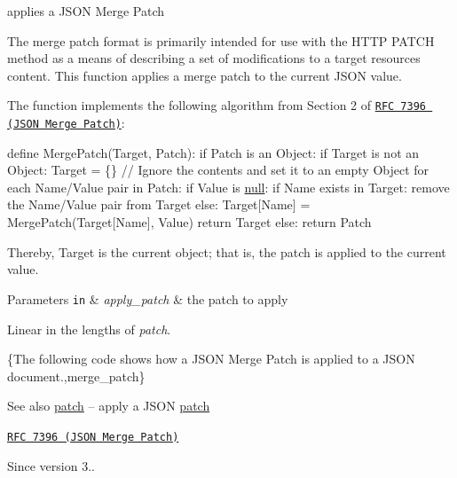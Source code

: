 applies a J\+S\+ON Merge Patch 

The merge patch format is primarily intended for use with the H\+T\+TP P\+A\+T\+CH method as a means of describing a set of modifications to a target resource\textquotesingle{}s content. This function applies a merge patch to the current J\+S\+ON value.

The function implements the following algorithm from Section 2 of \href{https://tools.ietf.org/html/rfc7396}{\tt R\+FC 7396 (J\+S\+ON Merge Patch)}\+:


\begin{DoxyCode}
define MergePatch(Target, Patch):
  if Patch is an Object:
    if Target is not an Object:
      Target = \{\} \textcolor{comment}{// Ignore the contents and set it to an empty Object}
    \textcolor{keywordflow}{for each} Name/Value pair in Patch:
      \textcolor{keywordflow}{if} Value is \hyperlink{namespacenlohmann_1_1detail_a1ed8fc6239da25abcaf681d30ace4985a37a6259cc0c1dae299a7866489dff0bd}{null}:
        \textcolor{keywordflow}{if} Name exists in Target:
          \textcolor{keyword}{remove} the Name/Value pair from Target
      \textcolor{keywordflow}{else}:
        Target[Name] = MergePatch(Target[Name], Value)
    return Target
  else:
    return Patch
\end{DoxyCode}


Thereby, {\ttfamily Target} is the current object; that is, the patch is applied to the current value.


\begin{DoxyParams}[1]{Parameters}
\mbox{\tt in}  & {\em apply\+\_\+patch} & the patch to apply\\
\hline
\end{DoxyParams}
Linear in the lengths of {\itshape patch}.

\{The following code shows how a J\+S\+ON Merge Patch is applied to a J\+S\+ON document.,merge\+\_\+patch\}

\begin{DoxySeeAlso}{See also}
\hyperlink{classnlohmann_1_1basic__json_a9c2abd53796bb301f57185e0a81b352a}{patch} -- apply a J\+S\+ON \hyperlink{classnlohmann_1_1basic__json_a9c2abd53796bb301f57185e0a81b352a}{patch} 

\href{https://tools.ietf.org/html/rfc7396}{\tt R\+FC 7396 (J\+S\+ON Merge Patch)}
\end{DoxySeeAlso}
\begin{DoxySince}{Since}
version 3.. 
\end{DoxySince}
